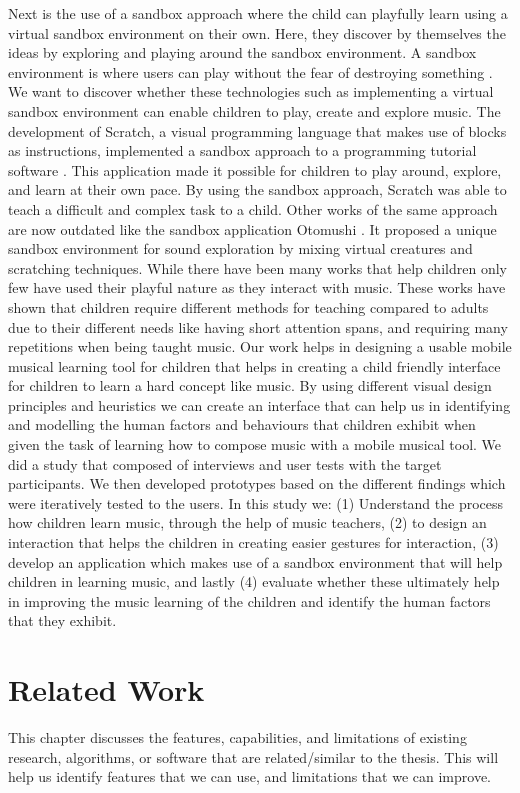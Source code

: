 Next is the use of a sandbox approach where the child can playfully learn using a virtual sandbox environment on their own. Here, they discover by themselves the ideas by exploring and playing around the sandbox environment. A sandbox environment is where users can play without the fear of destroying something \cite{burton2016music}.  We want to discover whether these technologies such as implementing a virtual sandbox environment can enable children to play, create and explore music. The development of Scratch, a visual programming language that makes use of blocks as instructions, implemented a sandbox approach to a programming tutorial software \cite{maloney2010scratch}. This application made it possible for children to play around, explore, and learn at their own pace. By using the sandbox approach, Scratch was able to teach a difficult and complex task to a child. Other works of the same approach are now outdated like the sandbox application Otomushi \cite{andre2010otomushi}. It proposed a unique sandbox environment for sound exploration by mixing virtual creatures and scratching techniques. While there have been many works that help children only few have used their playful nature as they interact with music. These works have shown that children require different methods for teaching compared to adults due to their different needs like having short attention spans, and requiring many repetitions when being taught music. Our work helps in designing a usable mobile musical learning tool for children that helps in creating a child friendly interface for children to learn a hard concept like music. By using different visual design principles and heuristics we can create an interface that can help us in identifying and modelling the human factors and behaviours that children exhibit when given the task of learning how to compose music with a mobile musical tool. We did a study that composed of interviews and user tests with the target participants. We then developed prototypes based on the different findings which were iteratively tested to the users. In this study we: (1) Understand the process how children learn music, through the help of music teachers, (2) to design an interaction that helps the children in creating easier gestures for interaction, (3) develop an application which makes use of a sandbox environment that will help children in learning music, and lastly (4) evaluate whether these ultimately help in improving the music learning of the children and identify the human factors that they exhibit.
\section{Related Work}
This  chapter  discusses  the  features,  capabilities,  and  limitations  of  existing  research, algorithms, or software that are related/similar to the thesis. This will help us identify features that we can use, and limitations that we can improve.
